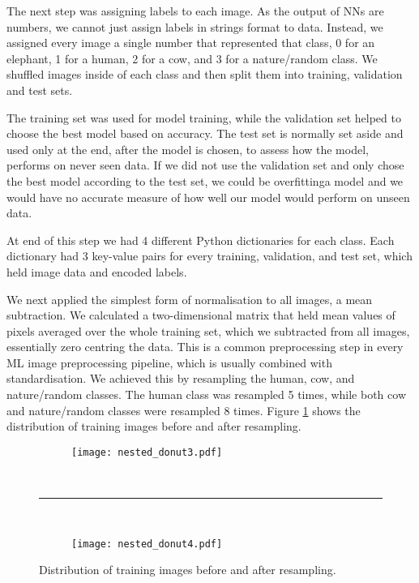 The next step was assigning labels to each image.
As the output of NNs are numbers, we cannot just assign labels in strings format to data.
Instead, we assigned every image a single number that represented that class, 0 for an elephant, 1 for a human, 2 for a cow, and 3 for a nature/random class.
We shuffled images inside of each class and then split them into training, validation and test sets.

The training set was used for model training, while the validation set helped to choose the best model based on accuracy.
The test set is normally set aside and used only at the end, after the model is chosen, to assess how the model, performs on never seen data.
If we did not use the validation set and only chose the best model according to the test set, we could be overfitting\footnotemark a model and we would have no accurate measure of how well our model would perform on unseen data.

At end of this step we had 4 different Python dictionaries for each class.
Each dictionary had 3 key-value pairs for every training, validation, and test set, which held image data and encoded labels.

We next applied the simplest form of normalisation to all images, a mean subtraction.
We calculated a two-dimensional matrix that held mean values of pixels averaged over the whole training set, which we subtracted from all images, essentially zero centring the data.
This is a common preprocessing step in every ML image preprocessing pipeline, which is usually combined with standardisation\footnotemark.
We achieved this by resampling the human, cow, and nature/random classes.
The human class was resampled 5 times, while both cow and nature/random classes were resampled 8 times.
Figure \ref{resampled} shows the distribution of training images before and after resampling.

\begin{figure}[ht] 
    \begin{subfigure}[b]{1\textwidth}
        \centering
        \texttt{[image: nested\_donut3.pdf]} 
    \end{subfigure}
    \unskip\ \hrule\ 
    \begin{subfigure}[b]{1\textwidth}
        \centering
        \texttt{[image: nested\_donut4.pdf]} 
    \end{subfigure}
    
    \caption{ Distribution of training images before and after resampling.}
    \label{resampled}
\end{figure}

